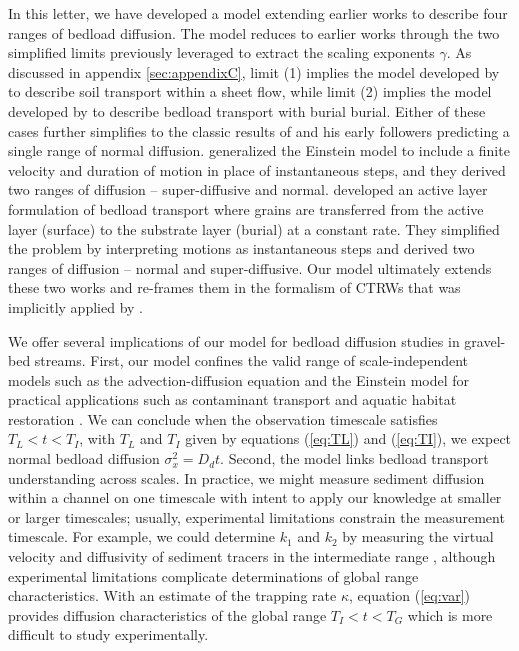 \documentclass[]{agujournal2018}
\begin{document}
In this letter, we have developed a model extending earlier works to describe four ranges of bedload diffusion.
The model reduces to earlier works through the two simplified limits previously leveraged to extract the scaling exponents $\gamma$.
As discussed in appendix \ref{sec:appendixC}, limit (1) implies the model developed by \citet{Lisle1998} to describe soil transport within a sheet flow, while limit (2) implies the model developed by \citet{Wu2019} to describe bedload transport with burial burial.
Either of these cases further simplifies to the classic results of \citet{Einstein1937} and his early followers \citep[e.g.][]{Hubbell1964, Nakagawa1976, Yano1969} predicting a single range of normal diffusion.
\citet{Lisle1998} generalized the Einstein model to include a finite velocity and duration of motion in place of instantaneous steps, and they derived two ranges of diffusion -- super-diffusive and normal.
\citet{Wu2019} developed an active layer formulation of bedload transport where grains are transferred from the active layer (surface) to the substrate layer (burial) at a constant rate.
They simplified the problem by interpreting motions as instantaneous steps and derived two ranges of diffusion -- normal and super-diffusive.
Our model ultimately extends these two works and re-frames them in the formalism of CTRWs \citep[e.g.][]{Weiss1994} that was implicitly applied by \citet{Einstein1937}.

We offer several implications of our model for bedload diffusion studies in gravel-bed streams.
First, our model confines the valid range of scale-independent models such as the advection-diffusion equation \citep[e.g.][]{Ganti2010} and the Einstein model \citep[e.g.][]{Martin2012} for practical applications such as contaminant transport \citep[e.g][]{Malmon2005,Macklin2006} and aquatic habitat restoration \citep[e.g.][]{Gaeuman2017}.
We can conclude when the observation timescale satisfies $T_L<t<T_I$, with $T_L$ and $T_I$ given by equations (\ref{eq:TL}) and (\ref{eq:TI}), we expect normal bedload diffusion $\sigma_x^2 = D_d t$.
Second, the model links bedload transport understanding across scales. 
In practice, we might measure sediment diffusion within a channel on one timescale with intent to apply our knowledge at smaller or larger timescales; usually, experimental limitations constrain the measurement timescale.
For example, we could determine $k_1$ and $k_2$ by measuring the virtual velocity and diffusivity of sediment tracers in the intermediate range \citep[e.g.][]{Einstein1937,Yano1969a,Nakagawa1976}, although experimental limitations complicate determinations of global range characteristics.
With an estimate of the trapping rate $\kappa$, equation (\ref{eq:var}) provides diffusion characteristics of the global range $T_I<t<T_G$ which is more difficult to study experimentally.
\end{document}
